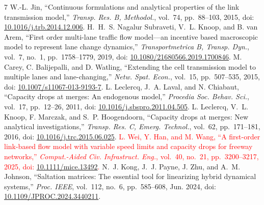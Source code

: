 \documentclass[10pt,a4paper]{article}
\newcommand{\head}[1]{\par\vspace{4pt}\noindent\textbf{#1}\par\nobreak\vspace{1pt}}
\newcommand{\rev}[1]{\textcolor{red}{#1}}
\begin{document}
\makeatletter
\renewcommand{\section}{\@ifstar{\head}{\head}}
\makeatother
\begin{thebibliography}{7}
\setlength{\itemsep}{0pt}\setlength{\parskip}{0pt}
 W.-L. Jin, ``Continuous formulations and analytical properties
of the link transmission model,'' \emph{Transp. Res. B, Methodol.}, vol.~74,
pp.~88--103, 2015, doi: \href{https://doi.org/10.1016/j.trb.2014.12.006}{10.1016/j.trb.2014.12.006}.
 H.~H.~S. Nagalur Subraveti, V.~L. Knoop, and B. van Arem,
``First order multi-lane traffic flow model---an incentive based macroscopic
model to represent lane change dynamics,'' \emph{Transportmetrica B, Transp.
Dyn.}, vol.~7, no.~1, pp.~1758--1779, 2019, doi:
\href{https://doi.org/10.1080/21680566.2019.1700846}{10.1080/21680566.2019.1700846}.
 M. Carey, C. Balijepalli, and D. Watling, ``Extending the cell
transmission model to multiple lanes and lane-changing,'' \emph{Netw. Spat.
Econ.}, vol.~15, pp.~507--535, 2015, doi:
\href{https://doi.org/10.1007/s11067-013-9193-7}{10.1007/s11067-013-9193-7}.
 L. Leclercq, J.~A. Laval, and N. Chiabaut,
``Capacity drops at merges: An endogenous model,'' \emph{Procedia Soc.
Behav. Sci.}, vol.~17, pp.~12--26, 2011, doi:
\href{https://doi.org/10.1016/j.sbspro.2011.04.505}{10.1016/j.sbspro.2011.04.505}.
 L. Leclercq, V.~L. Knoop, F. Marczak, and S.~P. Hoogendoorn,
``Capacity drops at merges: New analytical investigations,'' \emph{Transp.
Res. C, Emerg. Technol.}, vol.~62, pp.~171--181, 2016, doi:
\href{https://doi.org/10.1016/j.trc.2015.06.025}{10.1016/j.trc.2015.06.025}.
 \rev{L. Wei, Y. Han, and M. Wang, ``A first-order link-based flow
model with variable speed limits and capacity drops for freeway networks,''
\emph{Comput.-Aided Civ. Infrastruct. Eng.}, vol.~40, no.~21,
pp.~3200--3217, 2025, doi:
\href{https://doi.org/10.1111/mice.13492}{10.1111/mice.13492}.}
 N.~J. Kong, J.~J. Payne, J. Zhu, and A.~M. Johnson,
``Saltation matrices: The essential tool for linearizing hybrid dynamical
systems,'' \emph{Proc. IEEE}, vol.~112, no.~6, pp.~585--608, Jun. 2024, doi:
\href{https://doi.org/10.1109/JPROC.2024.3440211}{10.1109/JPROC.2024.3440211}.
\end{thebibliography}
\end{document}
